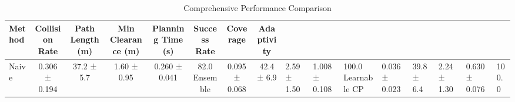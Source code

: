 \begin{table}[h]
\centering
\caption{Comprehensive Performance Comparison}
\label{tab:results}
\begin{tabular}{lccccccc}
\toprule
Method & Collision Rate & Path Length (m) & Min Clearance (m) & Planning Time (s) & Success Rate & Coverage & Adaptivity \\
\midrule
Naive & 0.306 ± 0.194 & 37.2 ± 5.7 & 1.60 ± 0.95 & 0.260 ± 0.041 & 82.0%
Ensemble & 0.095 ± 0.068 & 42.4 ± 6.9 & 2.59 ± 1.50 & 1.008 ± 0.108 & 100.0%
Learnable CP & 0.036 ± 0.023 & 39.8 ± 6.4 & 2.24 ± 1.30 & 0.630 ± 0.076 & 100.0%
\bottomrule
\end{tabular}
\end{table}
